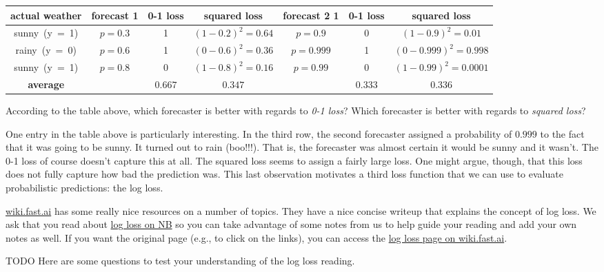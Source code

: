 \documentclass[assignment03_Solutions]{subfiles}
\begin{document}
\begin{table}
\centering
\small
\begin{tabular}{c | c | c | c | c | c | c}
\hline
actual weather & forecast 1 & 0-1 loss & squared loss & forecast 2 1 & 0-1 loss & squared loss \\
\hline
\mbox{sunny (y = 1)} & $p = 0.3$ & 1 & $(1-0.2)^2 = 0.64$ & $p = 0.9$ & 0 & $(1 - 0.9)^2 = 0.01$\\
\mbox{rainy (y = 0)} & $p = 0.6$  & 1 & $(0-0.6)^2 = 0.36$ & $p = 0.999$ & 1 & $(0 - 0.999)^2 = 0.998$ \\ 
\mbox{sunny (y = 1)} & $p = 0.8$ & 0 & $(1-0.8)^2 = 0.16$ & $p = 0.99$ & 0 & $(1 - 0.99)^2 = 0.0001$\\
\hline
\textbf{average} & & $0.667$ & $0.347$ & & 0.333 & 0.336
\end{tabular}
\end{table}

\normalsize %

\begin{understandingcheck}
According to the table above, which forecaster is better with regards to \emph{0-1 loss}?  Which forecaster is better with regards to \emph{squared loss}?
\end{understandingcheck}

One entry in the table above is particularly interesting.  In the third row, the second forecaster assigned a probability of $0.999$ to the fact that it was going to be sunny.  It turned out to rain (boo!!!).  That is, the forecaster was almost certain it would be sunny and it wasn't.  The 0-1 loss of course doesn't capture this at all.  The squared loss seems to assign a fairly large loss.  One might argue, though, that this loss does not fully capture how bad the prediction was.  This last observation motivates a third loss function that we can use to evaluate probabilistic predictions: the log loss.

\begin{externalresources}
\url{wiki.fast.ai} has some really nice resources on a number of topics.  They have a nice concise writeup that explains the concept of log loss.  We ask that you read about \href{http://nb.mit.edu/f/55213}{log loss on NB} so you can take advantage of some notes from us to help guide your reading and add your own notes as well.  If you want the original page (e.g., to click on the links), you can access the \href{http://wiki.fast.ai/index.php/Log_Loss}{log loss page on wiki.fast.ai}.
\begin{exercise}
TODO Here are some questions to test your understanding of the log loss reading.
\end{exercise}
\end{externalresources}
\end{document}
